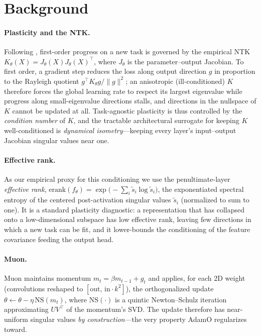 \documentclass[letterpaper]{article} %
\begin{document}
\section{Background}
\paragraph{Plasticity and the NTK.} Following \citet{adamo2026}, first-order progress on a new task is governed by the empirical NTK $K_\theta(X)=J_\theta(X)J_\theta(X)^\top$, where $J_\theta$ is the parameter--output Jacobian. To first order, a gradient step reduces the loss along output direction $g$ in proportion to the Rayleigh quotient $g^\top K_\theta g/\|g\|^2$; an anisotropic (ill-conditioned) $K$ therefore forces the global learning rate to respect its largest eigenvalue while progress along small-eigenvalue directions stalls, and directions in the nullspace of $K$ cannot be updated at all. Task-agnostic plasticity is thus controlled by the \emph{condition number} of $K$, and the tractable architectural surrogate for keeping $K$ well-conditioned is \emph{dynamical isometry}---keeping every layer's input--output Jacobian singular values near one.

\paragraph{Effective rank.} As our empirical proxy for this conditioning we use the penultimate-layer \emph{effective rank}, $\mathrm{erank}(f_\theta)=\exp\!\big(-\sum_i \tilde s_i\log \tilde s_i\big)$, the exponentiated spectral entropy of the centered post-activation singular values $\tilde s_i$ (normalized to sum to one). It is a standard plasticity diagnostic: a representation that has collapsed onto a low-dimensional subspace has low effective rank, leaving few directions in which a new task can be fit, and it lower-bounds the conditioning of the feature covariance feeding the output head.

\paragraph{Muon.} Muon maintains momentum $m_t=\beta m_{t-1}+g_t$ and applies, for each 2D weight (convolutions reshaped to $[\text{out},\,\text{in}\cdot k^2]$), the orthogonalized update $\theta\!\leftarrow\!\theta-\eta\,\mathrm{NS}(m_t)$, where $\mathrm{NS}(\cdot)$ is a quintic Newton--Schulz iteration approximating $UV^\top$ of the momentum's SVD. The update therefore has near-uniform singular values \emph{by construction}---the very property AdamO regularizes toward.
\end{document}
